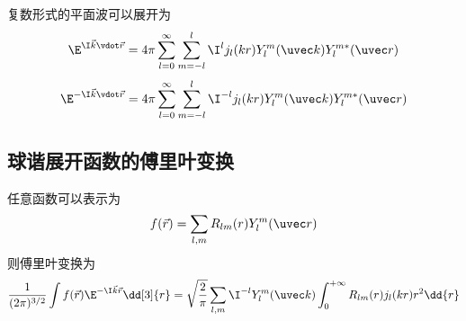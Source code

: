 
复数形式的平面波可以展开为
\begin{equation}
\E^{\I \vec k \vdot \vec r} = 4\pi \sum_{l=0}^{\infty} \sum_{m=-l}^l \I^l j_l(kr) Y_l^m(\uvec k) Y_l^{m*}(\uvec r)
\end{equation}
\begin{equation}
\E^{-\I \vec k \vdot \vec r} = 4\pi \sum_{l=0}^{\infty} \sum_{m=-l}^l \I^{-l} j_l(kr) Y_l^m(\uvec k) Y_l^{m*}(\uvec r)
\end{equation}

\subsection{球谐展开函数的傅里叶变换}

任意函数可以表示为
\begin{equation}
f(\vec r) = \sum_{l,m} R_{lm}(r) Y_l^m(\uvec r)
\end{equation}
则傅里叶变换为
\begin{equation}
\frac{1}{(2\pi)^{3/2}} \int f(\vec r) \E^{-\I \vec k \vec r} \dd[3]{r}
= \sqrt{\frac{2}{\pi}} \sum_{l,m} \I^{-l} Y_l^m(\uvec k) \int_0^{+\infty} R_{lm}(r) j_l(kr) r^2 \dd{r}
\end{equation}
